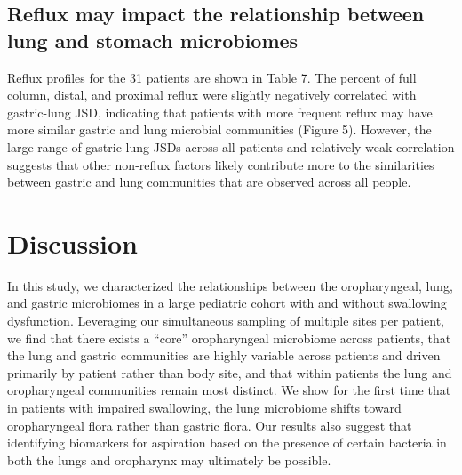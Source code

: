 \FloatBarrier

\subsection{Reflux may impact the relationship between lung and stomach microbiomes}

Reflux profiles for the 31 patients are shown in Table 7.
The percent of full column, distal, and proximal reflux were slightly negatively correlated with gastric-lung JSD, indicating that patients with more frequent reflux may have more similar gastric and lung microbial communities (Figure 5).
However, the large range of gastric-lung JSDs across all patients and relatively weak correlation suggests that other non-reflux factors likely contribute more to the similarities between gastric and lung communities that are observed across all people.


\FloatBarrier

\section{Discussion}

In this study, we characterized the relationships between the oropharyngeal, lung, and gastric microbiomes in a large pediatric cohort with and without swallowing dysfunction.
Leveraging our simultaneous sampling of multiple sites per patient, we find that there exists a ``core'' oropharyngeal microbiome across patients, that the lung and gastric communities are highly variable across patients and driven primarily by patient rather than body site, and that within patients the lung and oropharyngeal communities remain most distinct.
We show for the first time that in patients with impaired swallowing, the lung microbiome shifts toward oropharyngeal flora rather than gastric flora.
Our results also suggest that identifying biomarkers for aspiration based on the presence of certain bacteria in both the lungs and oropharynx may ultimately be possible.

